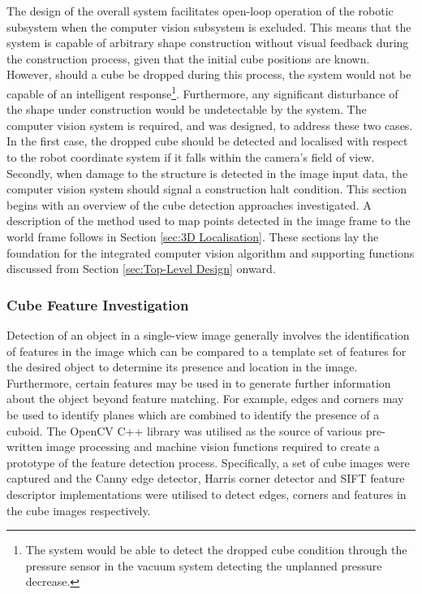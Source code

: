 The design of the overall system facilitates open-loop operation of the robotic subsystem when the computer vision subsystem is excluded. This means that the system is capable of arbitrary shape construction without visual feedback during the construction process, given that the initial cube positions are known. However, should a cube be dropped during this process, the system would not be capable of an intelligent response\footnote{The system would be able to detect the dropped cube condition through the pressure sensor in the vacuum system detecting the unplanned pressure decrease.}. Furthermore, any significant disturbance of the shape under construction would be undetectable by the system. The computer vision system is required, and was designed, to address these two cases. In the first case, the dropped cube should be detected and localised with respect to the robot coordinate system if it falls within the camera's field of view. Secondly, when damage to the structure is detected in the image input data, the computer vision system should signal a construction halt condition. This section begins with an overview of the cube detection approaches investigated. A description of the method used to map points detected in the image frame to the world frame follows in Section \ref{sec:3D Localisation}. These sections lay the foundation for the integrated computer vision algorithm and supporting functions discussed from Section \ref{sec:Top-Level Design} onward.

\subsubsection{Cube Feature Investigation} \label{sec:Cube Feature Investigation}

Detection of an object in a single-view image generally involves the identification of features in the image which can be compared to a template set of features for the desired object to determine its presence and location in the image. Furthermore, certain features may be used in to generate further information about the object beyond feature matching. For example, edges and corners may be used to identify planes which are combined to identify the presence of a cuboid. The OpenCV C++ library was utilised as the source of various pre-written image processing and machine vision functions required to create a prototype of the feature detection process. Specifically, a set of cube images were captured and the Canny edge detector, Harris corner detector and SIFT feature descriptor implementations were utilised to detect edges, corners and features in the cube images respectively. 

